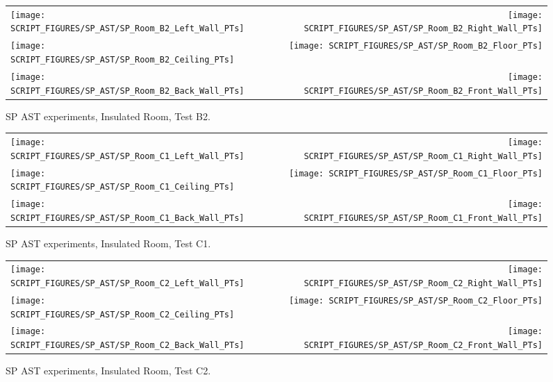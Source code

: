 \begin{figure}[p]
\begin{tabular*}{\textwidth}{l@{\extracolsep{\fill}}r}
\texttt{[image: SCRIPT\_FIGURES/SP\_AST/SP\_Room\_B2\_Left\_Wall\_PTs]} &  \texttt{[image: SCRIPT\_FIGURES/SP\_AST/SP\_Room\_B2\_Right\_Wall\_PTs]}  \\
\texttt{[image: SCRIPT\_FIGURES/SP\_AST/SP\_Room\_B2\_Ceiling\_PTs]}   &  \texttt{[image: SCRIPT\_FIGURES/SP\_AST/SP\_Room\_B2\_Floor\_PTs]}  \\
\texttt{[image: SCRIPT\_FIGURES/SP\_AST/SP\_Room\_B2\_Back\_Wall\_PTs]} &  \texttt{[image: SCRIPT\_FIGURES/SP\_AST/SP\_Room\_B2\_Front\_Wall\_PTs]}
\end{tabular*}
\caption{SP AST experiments, Insulated Room, Test B2.}
\label{SP_Room_B2_PTs}
\end{figure}

\begin{figure}[p]
\begin{tabular*}{\textwidth}{l@{\extracolsep{\fill}}r}
\texttt{[image: SCRIPT\_FIGURES/SP\_AST/SP\_Room\_C1\_Left\_Wall\_PTs]} &  \texttt{[image: SCRIPT\_FIGURES/SP\_AST/SP\_Room\_C1\_Right\_Wall\_PTs]}  \\
\texttt{[image: SCRIPT\_FIGURES/SP\_AST/SP\_Room\_C1\_Ceiling\_PTs]}   &  \texttt{[image: SCRIPT\_FIGURES/SP\_AST/SP\_Room\_C1\_Floor\_PTs]}  \\
\texttt{[image: SCRIPT\_FIGURES/SP\_AST/SP\_Room\_C1\_Back\_Wall\_PTs]} &  \texttt{[image: SCRIPT\_FIGURES/SP\_AST/SP\_Room\_C1\_Front\_Wall\_PTs]}
\end{tabular*}
\caption{SP AST experiments, Insulated Room, Test C1.}
\label{SP_Room_C1_PTs}
\end{figure}

\begin{figure}[p]
\begin{tabular*}{\textwidth}{l@{\extracolsep{\fill}}r}
\texttt{[image: SCRIPT\_FIGURES/SP\_AST/SP\_Room\_C2\_Left\_Wall\_PTs]} &  \texttt{[image: SCRIPT\_FIGURES/SP\_AST/SP\_Room\_C2\_Right\_Wall\_PTs]}  \\
\texttt{[image: SCRIPT\_FIGURES/SP\_AST/SP\_Room\_C2\_Ceiling\_PTs]}   &  \texttt{[image: SCRIPT\_FIGURES/SP\_AST/SP\_Room\_C2\_Floor\_PTs]}  \\
\texttt{[image: SCRIPT\_FIGURES/SP\_AST/SP\_Room\_C2\_Back\_Wall\_PTs]} &  \texttt{[image: SCRIPT\_FIGURES/SP\_AST/SP\_Room\_C2\_Front\_Wall\_PTs]}
\end{tabular*}
\caption{SP AST experiments, Insulated Room, Test C2.}
\label{SP_Room_C2_PTs}
\end{figure}

